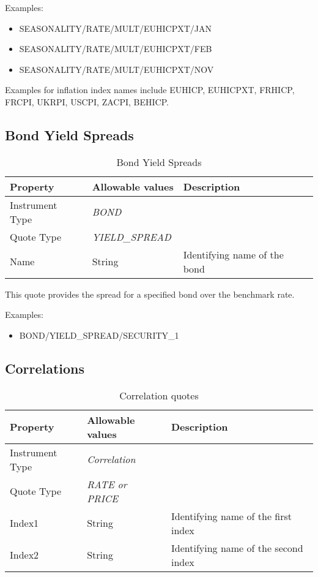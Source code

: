 \medskip
Examples:
\begin{itemize}
\item SEASONALITY/RATE/MULT/EUHICPXT/JAN
\item SEASONALITY/RATE/MULT/EUHICPXT/FEB
\item SEASONALITY/RATE/MULT/EUHICPXT/NOV
\end{itemize}

Examples for inflation index names include EUHICP, EUHICPXT, FRHICP, FRCPI, UKRPI, USCPI, ZACPI, BEHICP.

\subsection{Bond Yield Spreads}

\begin{table}[H]
\centering
  \begin{tabular}{|p{3cm}|p{3.5cm}|p{7cm}|}
  \hline
  {\bf Property} & {\bf Allowable values} & {\bf Description} \\ \hline
    Instrument Type & \emph{BOND} & \\ \hline
    Quote Type & \emph{YIELD\_SPREAD} & \\ \hline
    Name & String & Identifying name of the bond \\ \hline
  \end{tabular}
  \caption{Bond Yield Spreads}
  \label{tab:bondyieldspread_quote}
\end{table}

This quote provides the spread for a specified bond over the benchmark rate.

\medskip
Examples:
\begin{itemize}
	\item BOND/YIELD\_SPREAD/SECURITY\_1
\end{itemize}

\subsection{Correlations}

\begin{table}[H]
\centering
  \begin{tabular}{|p{3cm}|p{3.5cm}|p{7cm}|}
  \hline
  {\bf Property} & {\bf Allowable values} & {\bf Description} \\ \hline
    Instrument Type & \emph{Correlation} & \\ \hline
    Quote Type & \emph{RATE or PRICE} & \\ \hline
    Index1 & String & Identifying name of the first index \\ \hline
    Index2 & String & Identifying name of the second index \\ \hline
  \end{tabular}
  \caption{Correlation quotes}
  \label{tab:correlation_quote}
\end{table}

